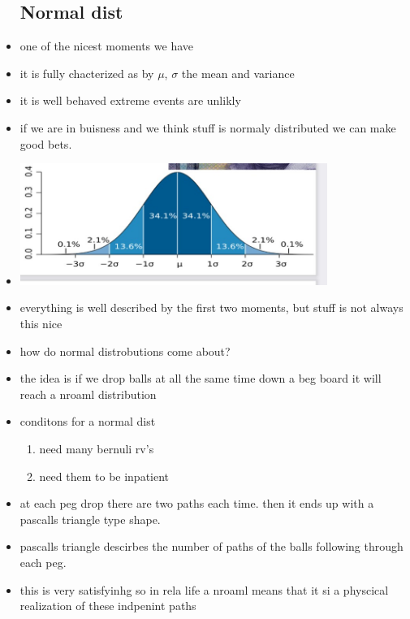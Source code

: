 \documentclass{article}
\begin{document}
\begin{itemize}
    \subsection{Normal dist }
    \item one of the nicest moments we have 
    \item it is fully chacterized as by $\mu$, $\sigma$ the mean and variance 
    \item it is well behaved extreme events are unlikly 
    \item if we are in buisness and we think stuff is normaly distributed we can make good bets. 
    \item \includegraphics[width=10cm]{Final_Review/lecture_3/unfirom .jpg}
    \item everything is well described by the first two moments, but stuff is not always this nice 
    \item how do normal distrobutions come about? 
    \item the idea is if we drop balls at all the same time down a beg board it will reach a nroaml distribution 
    \item conditons for a normal dist
    \begin{enumerate}
        \item need many bernuli rv's
        \item need them to be inpatient 
    \end{enumerate}
    \item at each peg drop there are two paths each time. then it ends up with a pascalls triangle type shape. 
    \item pascalls triangle descirbes the number of paths of the balls following through each peg. 
    \item this is very satisfyinhg 
    \itme so in rela life a nroaml means that it si a physcical realization of these indpenint paths 

\end{itemize}
\end{document}
